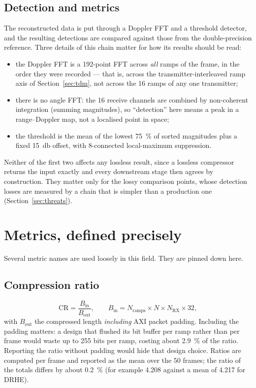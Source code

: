 \subsection{Detection and metrics}
The reconstructed data is put through a Doppler FFT and a threshold detector,
and the resulting detections are compared against those from the
double-precision reference. Three details of this chain matter for how its
results should be read:

\begin{itemize}
\item the Doppler FFT is a 192-point FFT across \emph{all} ramps of the frame,
in the order they were recorded --- that is, across the transmitter-interleaved
ramp axis of Section~\ref{sec:tdm}, not across the 16 ramps of any one
transmitter;
\item there is no angle FFT: the 16 receive channels are combined by
non-coherent integration (summing magnitudes), so ``detection'' here means a
peak in a range--Doppler map, not a localised point in space;
\item the threshold is the mean of the lowest \SI{75}{\percent} of sorted
magnitudes plus a fixed \SI{15}{\decibel} offset, with 8-connected
local-maximum suppression.
\end{itemize}

\noindent
Neither of the first two affects any lossless result, since a lossless
compressor returns the input exactly and every downstream stage then agrees by
construction. They matter only for the lossy comparison points, whose detection
losses are measured by a chain that is simpler than a production one
(Section~\ref{sec:threats}).

\section{Metrics, defined precisely}
\label{sec:metrics}

Several metric names are used loosely in this field. They are pinned down here.

\subsection{Compression ratio}
\begin{equation}
\mathrm{CR} = \frac{B_{\mathrm{in}}}{B_{\mathrm{out}}},
\qquad
B_{\mathrm{in}} = N_{\mathrm{ramps}} \times N \times N_{\mathrm{RX}} \times 32,
\end{equation}
with $B_{\mathrm{out}}$ the compressed length \emph{including} AXI packet
padding. Including the padding matters: a design that flushed its bit buffer
per ramp rather than per frame would waste up to 255 bits per ramp, costing
about \SI{2.9}{\percent} of the ratio. Reporting the ratio without padding
would hide that design choice. Ratios are computed per frame and reported as
the mean over the 50 frames; the ratio of the totals differs by about
\SI{0.2}{\percent} (for example \num{4.208} against a mean of \num{4.217} for
DRHE).

